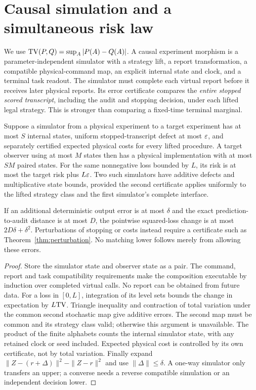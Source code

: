\section{Causal simulation and a simultaneous risk law}
\label{sec:composition}
We use $\mathrm{TV}(P,Q)=\sup_A|P(A)-Q(A)|$. A causal experiment morphism is a parameter-independent simulator with a strategy lift, a report transformation, a compatible physical-command map, an explicit internal state and clock, and a terminal task readout. The simulator must complete each virtual report before it receives later physical reports. Its error certificate compares the \emph{entire stopped scored transcript}, including the audit and stopping decision, under each lifted legal strategy. This is stronger than comparing a fixed-time terminal marginal.

\begin{proposition}\label{prop:composition}
Suppose a simulator from a physical experiment to a target experiment has at most $S$ internal states, uniform stopped-transcript defect at most $\varepsilon$, and separately certified expected physical costs for every lifted procedure. A target observer using at most $M$ states then has a physical implementation with at most $SM$ paired states. For the same nonnegative loss bounded by $L$, its risk is at most the target risk plus $L\varepsilon$. Two such simulators have additive defects and multiplicative state bounds, provided the second certificate applies uniformly to the lifted strategy class and the first simulator's complete interface.

If an additional deterministic output error is at most $\delta$ and the exact prediction-to-audit distance is at most $D$, the pointwise squared-loss change is at most $2D\delta+\delta^2$. Perturbations of stopping or costs instead require a certificate such as Theorem~\ref{thm:perturbation}. No matching lower follows merely from allowing these errors.
\end{proposition}
\begin{proof}
Store the simulator state and observer state as a pair. The command, report and task compatibility requirements make the composition executable by induction over completed virtual calls. No report can be obtained from future data. For a loss in $[0,L]$, integration of its level sets bounds the change in expectation by $L\mathrm{TV}$. Triangle inequality and contraction of total variation under the common second stochastic map give additive errors. The second map must be common and its strategy class valid; otherwise this argument is unavailable. The product of the finite alphabets counts the internal simulator state, with any retained clock or seed included. Expected physical cost is controlled by its own certificate, not by total variation. Finally expand $\|Z-(r+\Delta)\|^2-\|Z-r\|^2$ and use $\|\Delta\|\le\delta$. A one-way simulator only transfers an upper; a converse needs a reverse compatible simulation or an independent decision lower.
\end{proof}

